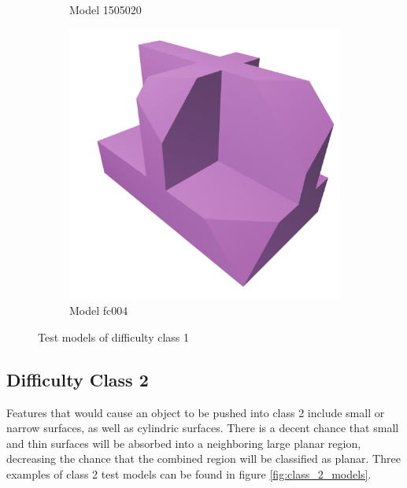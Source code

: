 \begin{figure}[htb]
\begin{subfigure}{0.3\textwidth}
	\caption{Model 1505020}
\end{subfigure}
\hfill
\begin{subfigure}{0.3\textwidth}
	\includegraphics[width=\textwidth]{../resources/models/fc004.png}
	\caption{Model fc004}
\end{subfigure}
\caption{Test models of difficulty class 1}
\label{fig:class_1_models}
\end{figure}

\subsection{Difficulty Class 2}
Features that would cause an object to be pushed into class 2 include small or narrow surfaces, as well as cylindric surfaces.
There is a decent chance that small and thin surfaces will be absorbed into a neighboring large planar region, decreasing the chance that the combined region will be classified as planar.
Three examples of class 2 test models can be found in figure \ref{fig:class_2_models}.

